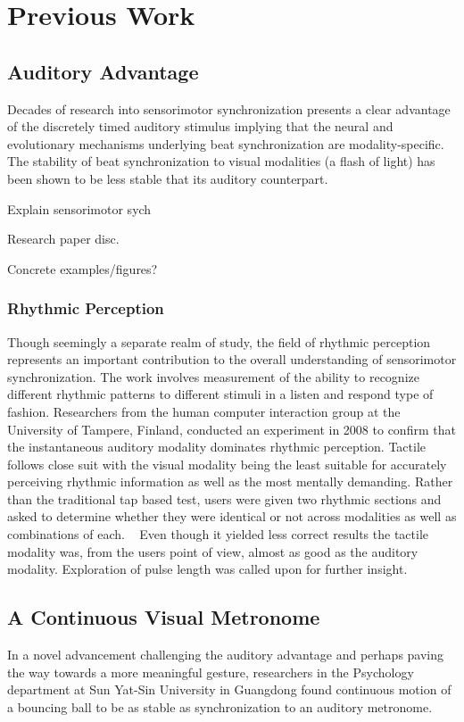 \chapter{Previous Work}
\section{Auditory Advantage}
Decades of research into sensorimotor synchronization presents a clear advantage of the discretely timed auditory stimulus implying that the neural and evolutionary mechanisms underlying beat synchronization are modality-specific. ~\cite{gan2015synchronization} The stability of beat synchronization to visual modalities (a flash of light) has been shown to be less stable that its auditory counterpart.

Explain sensorimotor sych

Research paper disc.

Concrete examples/figures?

\subsection{Rhythmic Perception}
Though seemingly a separate realm of study, the field of rhythmic perception represents an important contribution to the overall understanding of sensorimotor synchronization. The work involves measurement of the ability to recognize different rhythmic patterns to different stimuli in a listen and respond type of fashion. Researchers from the human computer interaction group at the University of Tampere, Finland, conducted an experiment in 2008 to confirm that the instantaneous auditory modality dominates rhythmic perception. Tactile follows close suit with the visual modality being the least suitable for accurately perceiving rhythmic information as well as the most mentally demanding. Rather than the traditional tap based test, users were given two rhythmic sections and asked to determine whether they were identical or not across modalities as well as combinations of each. ~\cite{jokiniemi2008crossmodal} Even though it yielded less correct results the tactile modality was, from the users point of view, almost as good as the auditory modality. Exploration of pulse length was called upon for further insight.

\section{A Continuous Visual Metronome}
In a novel advancement challenging the auditory advantage and perhaps paving the way towards a more meaningful gesture, researchers in the Psychology department at Sun Yat-Sin University in Guangdong found continuous motion of a bouncing ball to be as stable as synchronization to an auditory metronome.



